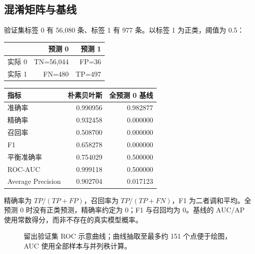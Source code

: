 \documentclass[UTF8,a4paper,zihao=5,fontset=none]{ctexart}
\begin{document}
\subsection{混淆矩阵与基线}
验证集标签 0 有 56,080 条、标签 1 有 977 条。以标签 1 为正类，阈值为 0.5：
\begin{table}[H]\centering
\begin{tabular}{l r r}\toprule & 预测 0 & 预测 1\\\midrule
实际 0 & TN=56,044 & FP=36\\
实际 1 & FN=480 & TP=497\\\bottomrule\end{tabular}
\end{table}
\begin{table}[H]\centering\small
\begin{tabular}{l r r}\toprule 指标 & 朴素贝叶斯 & 全预测 0 基线\\\midrule
准确率 & 0.990956 & 0.982877\\
精确率 & 0.932458 & 0.000000\\
召回率 & 0.508700 & 0.000000\\
F1 & 0.658278 & 0.000000\\
平衡准确率 & 0.754029 & 0.500000\\
ROC-AUC & 0.999118 & 0.500000\\
Average Precision & 0.902704 & 0.017123\\\bottomrule\end{tabular}
\end{table}
精确率为 $TP/(TP+FP)$，召回率为 $TP/(TP+FN)$，F1 为二者调和平均。全预测 0 时没有正类预测，精确率约定为 0；F1 与召回均为 0。基线的 AUC/AP 使用常数得分，而非不存在的真实模型概率。

\begin{figure}[H]\centering
{}
\caption{留出验证集 ROC 示意曲线；曲线抽取至最多约 151 个点便于绘图，AUC 使用全部样本与并列秩计算。}
\end{figure}
\end{document}
